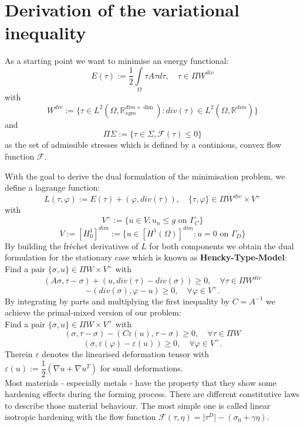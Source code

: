 \documentclass{article}
\begin{document}
\section{Derivation of the variational inequality}

As a starting point we want to minimise an energy functional:
$$E(\tau) := \dfrac{1}{2}\int\limits_{\Omega}\tau A \tau d\tau,\quad \tau\in \Pi W^{div}$$
with
$$W^{div}:=\lbrace \tau\in
L^2(\Omega,\mathbb{R}^{dim\times\dim}_{sym}):div(\tau)\in L^2(\Omega,\mathbb{R}^{dim})\rbrace$$ and
$$\Pi \Sigma:=\lbrace \tau\in \Sigma, \mathcal{F}(\tau)\leq 0\rbrace$$
as the set of admissible stresses which is defined
by a continious, convex flow function $\mathcal{F}$.

With the goal to derive the dual formulation of the minimisation problem, we define a lagrange function:
$$L(\tau,\varphi) := E(\tau) + (\varphi, div(\tau)),\quad \lbrace\tau,\varphi\rbrace\in\Pi W^{div}\times V^+$$
with
$$V^+ := \lbrace u\in V: u_n\leq g \text{ on } \Gamma_C \rbrace$$
$$V:=\left[ H_0^1 \right]^{dim}:=\lbrace u\in \left[H^1(\Omega)\right]^{dim}: u
= 0 \text{ on } \Gamma_D\rbrace$$
By building the fr\'echet derivatives of $L$ for both components we obtain the dual formulation for the stationary case
which is known as \textbf{Hencky-Type-Model}:\\
Find a pair $\lbrace\sigma,u\rbrace\in \Pi W\times V^+$ with
$$\left(A\sigma,\tau - \sigma\right) + \left(u, div(\tau) - div(\sigma)\right) \geq 0,\quad \forall \tau\in \Pi W^{div}$$
$$-\left(div(\sigma),\varphi - u\right) \geq 0,\quad \forall \varphi\in V^+.$$
By integrating by parts and multiplying the first inequality by $C=A^{-1}$  we achieve the primal-mixed version of our problem:\\
Find a pair $\lbrace\sigma,u\rbrace\in \Pi W\times V^+$ with
$$\left(\sigma,\tau - \sigma\right) - \left(C\varepsilon(u), \tau - \sigma\right) \geq 0,\quad \forall \tau\in \Pi W$$
$$\left(\sigma,\varepsilon(\varphi) - \varepsilon(u)\right) \geq 0,\quad \forall \varphi\in V^+.$$
Therein $\varepsilon$ denotes the linearised deformation tensor with $\varepsilon(u) := \dfrac{1}{2}\left(\nabla u + \nabla u^T\right)$ for small deformations.\\
Most materials - especially metals - have the property that they show some hardening effects during the forming process.
There are different constitutive laws to describe those material behaviour. The most simple one is called linear isotropic hardening
with the flow function $\mathcal{F}(\tau,\eta) = \vert\tau^D\vert - (\sigma_0 + \gamma\eta)$.
\end{document}
